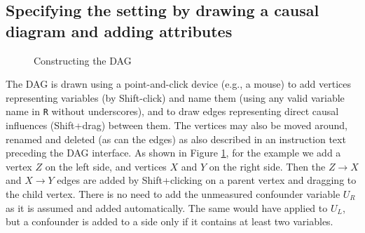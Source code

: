 \hypertarget{specifying-the-setting-by-drawing-a-causal-diagram-and-adding-attributes}{%
\subsection{Specifying the setting by drawing a causal diagram and adding attributes}\label{specifying-the-setting-by-drawing-a-causal-diagram-and-adding-attributes}}

\begin{figure}
\caption{Constructing the DAG}\label{fig:DAG}
\end{figure}

The DAG is drawn using a point-and-click device (e.g., a mouse) to add vertices representing variables (by Shift-click) and name them (using any valid variable name in \texttt{R} without underscores), and to draw edges representing direct causal influences (Shift+drag) between them. The vertices may also be moved around, renamed and deleted (as can the edges) as also described in an instruction text preceding the DAG interface. As shown in Figure \ref{fig:DAG}, for the example we add a vertex \(Z\) on the left side, and vertices \(X\) and \(Y\) on the right side. Then the \(Z \to X\) and \(X \to Y\) edges are added by Shift+clicking on a parent vertex and dragging to the child vertex. There is no need to add the unmeasured confounder variable \(U_R\) as it is assumed and added automatically. The same would have applied to \(U_L\), but a confounder is added to a side only if it contains at least two variables.

